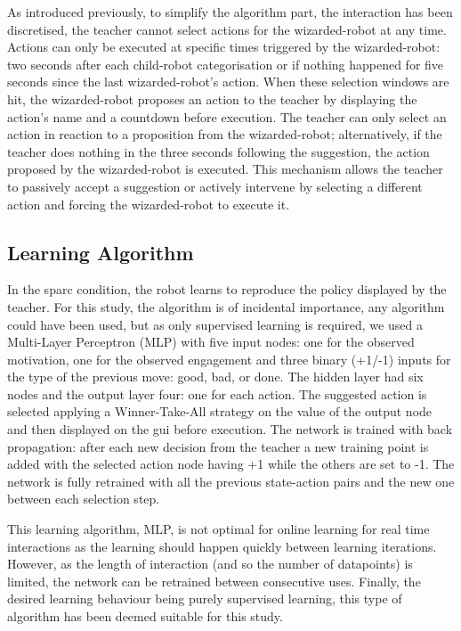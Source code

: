 As introduced previously, to simplify the algorithm part, the interaction has been discretised, the teacher cannot select actions for the wizarded-robot at any time. Actions can only be executed at specific times triggered by the wizarded-robot: two seconds after each child-robot categorisation or if nothing happened for five seconds since the last wizarded-robot's action. When these selection windows are hit, the wizarded-robot proposes an action to the teacher by displaying the action's name and a countdown before execution. The teacher can only select an action in reaction to a proposition from the wizarded-robot; alternatively, if the teacher does nothing in the three seconds following the suggestion, the action proposed by the wizarded-robot is executed. This mechanism allows the teacher to passively accept a suggestion or actively intervene by selecting a different action and forcing the wizarded-robot to execute it.

\subsection{Learning Algorithm}

In the \gls{sparc} condition, the robot learns to reproduce the policy displayed by the teacher. For this study, the algorithm is of incidental importance, any algorithm could have been used, but as only supervised learning is required, we used a Multi-Layer Perceptron (MLP) with five input nodes: one for the observed motivation, one for the observed engagement and three binary (+1/-1) inputs for the type of the previous move: good, bad, or done. The hidden layer had six nodes and the output layer four: one for each action. The suggested action is selected applying a Winner-Take-All strategy on the value of the output node and then displayed on the \gls{gui} before execution. The network is trained with back propagation: after each new decision from the teacher a new training point is added with the selected action node having +1 while the others are set to -1. The network is fully retrained with all the previous state-action pairs and the new one between each selection step. 

This learning algorithm, MLP, is not optimal for online learning for real time interactions as the learning should happen quickly between learning iterations. However, as the length of interaction (and so the number of datapoints) is limited, the network can be retrained between consecutive uses. Finally, the desired learning behaviour being purely supervised learning, this type of algorithm has been deemed suitable for this study.

